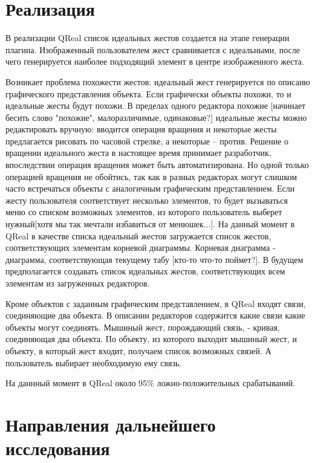 \documentclass[a5paper]{article}
\begin{document}
\section{Реализация}

В реализации QReal список идеальных жестов создается на этапе генерации плагина. Изображенный пользователем жест сравнивается с идеальными, 
после чего генерируется наиболее подходящий элемент в центре изображенного жеста. 

Возникает проблема похожести жестов: идеальный жест генерируется по описаню графического представления объекта. Если графически объекты похожи, 
то и идеальные жесты будут похожи. В пределах одного редактора похожие [начинает бесить слово "похожие", малоразличимые, одинаковые?] идеальные 
жесты можно редактировать вручную: вводится операция вращения и некоторые жесты предлагается рисовать по часовой стрелке, а некоторые --
 против. Решение о вращении идеального жеста в настоящее время принимает разработчик, впоследствии операция вращения может быть автоматизирована. 
Но одной только операцией вращения не обойтись, так как в разных редакторах могут слишком часто встречаться объекты с аналогичным графическим 
представлением. Если жесту пользователя соответствует несколько элементов, то будет вызываться меню со списком возможных элементов, из 
которого пользователь выберет нужный[хотя мы так мечтали избавиться от менюшек...]. На данный момент в QReal в качестве списка идеальный 
жестов загружается список жестов, соответствующих элементам корневой диаграммы. Корневая диаграмма - диаграмма, соответствующая текущему 
табу [кто-то что-то поймет?]. В будущем предполагается создавать список идеальных жестов, соответствующих всем элементам из загруженных 
редакторов.

Кроме объектов с заданным графическим представлением, в QReal входят связи, соединяющие два объекта. В описании редакторов содержится какие 
связи какие объекты могут соединять. Мышиный жест, порождающий связь, - кривая, соединяющая два объекта. По объекту, из которого выходит 
мышиный жест, и объекту, в который жест входит, получаем список возможных связей. А пользователь выбирает необходимую ему связь.

На даннный момент в QReal около 95\% ложно-положительных срабатываний.

\section{Направления дальнейшего исследования}
\end{document}
